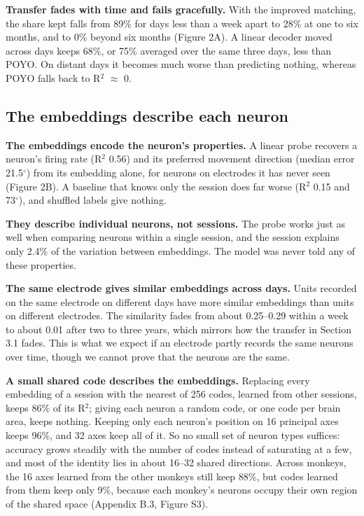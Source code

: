 \documentclass[11pt]{article}
\begin{document}
\textbf{Transfer fades with time and fails gracefully.} With the improved matching, the share kept falls from 89\% for days less than a week apart to 28\% at one to six months, and to 0\% beyond six months (Figure 2A). A linear decoder moved across days keeps 68\%, or 75\% averaged over the same three days, less than POYO. On distant days it becomes much worse than predicting nothing, whereas POYO falls back to R$^{2}$ $\approx$ 0.

\subsection{The embeddings describe each neuron}

\textbf{The embeddings encode the neuron's properties.} A linear probe recovers a neuron's firing rate (R$^{2}$ 0.56) and its preferred movement direction (median error 21.5$^\circ$) from its embedding alone, for neurons on electrodes it has never seen (Figure 2B). A baseline that knows only the session does far worse (R$^{2}$ 0.15 and 73$^\circ$), and shuffled labels give nothing.

\textbf{They describe individual neurons, not sessions.} The probe works just as well when comparing neurons within a single session, and the session explains only 2.4\% of the variation between embeddings. The model was never told any of these properties.

\textbf{The same electrode gives similar embeddings across days.} Units recorded on the same electrode on different days have more similar embeddings than units on different electrodes. The similarity fades from about 0.25--0.29 within a week to about 0.01 after two to three years, which mirrors how the transfer in Section 3.1 fades. This is what we expect if an electrode partly records the same neurons over time, though we cannot prove that the neurons are the same.

\textbf{A small shared code describes the embeddings.} Replacing every embedding of a session with the nearest of 256 codes, learned from other sessions, keeps 86\% of its R$^{2}$; giving each neuron a random code, or one code per brain area, keeps nothing. Keeping only each neuron's position on 16 principal axes keeps 96\%, and 32 axes keep all of it. So no small set of neuron types suffices: accuracy grows steadily with the number of codes instead of saturating at a few, and most of the identity lies in about 16--32 shared directions. Across monkeys, the 16 axes learned from the other monkeys still keep 88\%, but codes learned from them keep only 9\%, because each monkey's neurons occupy their own region of the shared space (Appendix B.3, Figure S3).
\end{document}

